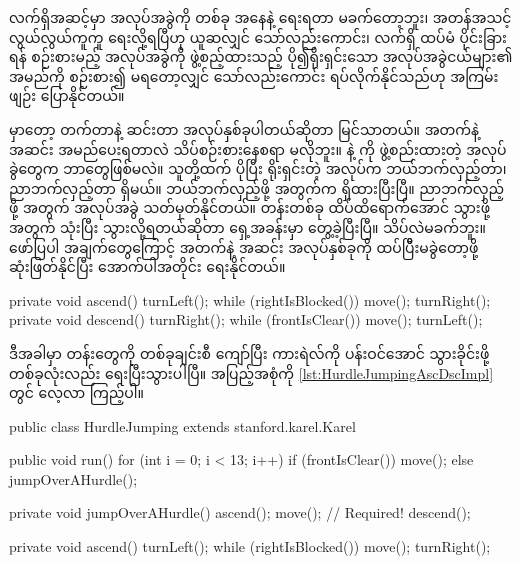 \begin{sloppypar}
လက်ရှိအဆင့်မှာ အလုပ်အခွဲကို \mmcommand တစ်ခု အနေနဲ့ ရေးရတာ မခက်တော့ဘူး၊ အတန်အသင့် လွယ်လွယ်ကူကူ ရေးလို့ရပြီဟု ယူဆလျှင် သော်လည်းကောင်း၊ လက်ရှိ ထပ်မံ ပိုင်းခြားရန် စဉ်းစားမည့် အလုပ်အခွဲကို ဖွဲ့စည့်ထားသည့် ပို၍ရိုးရှင်းသော အလုပ်အခွဲငယ်များ၏ အမည်ကို စဉ်းစား၍ မရတော့လျှင် သော်လည်းကောင်း ရပ်လိုက်နိုင်သည်ဟု အကြမ်းဖျဉ်း ပြောနိုင်တယ်။ 

 မှာတော့ တက်တာနဲ့ ဆင်းတာ အလုပ်နှစ်ခုပါတယ်ဆိုတာ မြင်သာတယ်။ အတက်နဲ့ အဆင်း အမည်ပေးရတာလဲ သိပ်စဉ်းစားနေစရာ မလိုဘူး။  နဲ့  ကို ဖွဲ့စည်းထားတဲ့ အလုပ်ခွဲတွေက ဘာတွေဖြစ်မလဲ။ သူတို့ထက် ပိုပြီး ရိုးရှင်းတဲ့ အလုပ်က ဘယ်ဘက်လှည့်တာ၊ ညာဘက်လှည့်တာ ရှိမယ်။ ဘယ်ဘက်လှည့်ဖို့ အတွက်က  ရှိထားပြီးပြီ။ ညာဘက်လှည့်ဖို့ အတွက်  အလုပ်အခွဲ သတ်မှတ်နိုင်တယ်။ တန်းတစ်ခု ထိပ်ထိရောက်အောင် သွားဖို့အတွက်  သုံးပြီး သွားလို့ရတယ်ဆိုတာ ရှေ့အခန်းမှာ တွေ့ခဲ့ပြီးပြီ။ သိပ်လဲမခက်ဘူး။ ဖော်ပြပါ အချက်တွေကြောင့် အတက်နဲ့ အဆင်း အလုပ်နှစ်ခုကို ထပ်ပြီီးမခွဲတော့ဖို့ ဆုံးဖြတ်နိုင်ပြီး အောက်ပါအတိုင်း ရေးနိုင်တယ်။
\begin{lstcodeminimal}
private void ascend() {
        turnLeft();
        while (rightIsBlocked()) {
                move();
        }
        turnRight();
}
private void descend() {
        turnRight();
        while (frontIsClear()) {
                move();
        }
        turnLeft();
}
\end{lstcodeminimal}
ဒီအခါမှာ တန်းတွေကို တစ်ခုချင်းစီ ကျော်ပြီး ကားရဲလ်ကို ပန်းဝင်အောင် သွားခိုင်းဖို့ \mmprogram တစ်ခုလုံးလည်း ရေးပြီးသွားပါပြီ။ အပြည့်အစုံကို \Lst \ref{lst:HurdleJumpingAscDscImpl} တွင် ‌လေ့လာ ကြည့်ပါ။

\begin{lstcodelong}[{\mycodelstcpt{HurdleJumping}}, label={lst:HurdleJumpingAscDscImpl}] 
public class HurdleJumping extends stanford.karel.Karel {
        public void run(){
                for (int i = 0; i < 13; i++) {
                        if (frontIsClear()) {
                                move();
                        } else {
                                jumpOverAHurdle();
                        }
                }
        }

        private void jumpOverAHurdle(){
                ascend();
                move(); // Required!
                descend();
        }

        private void ascend() {
                turnLeft();
                while (rightIsBlocked()) {
                        move();
                }
                turnRight();
        }

}
\end{lstcodelong}
\end{sloppypar}
